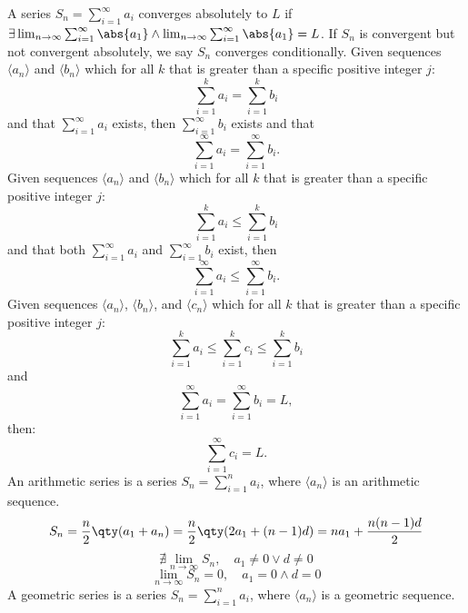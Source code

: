 \documentclass[a4paper,12pt]{report}
\begin{document}
A series $S_n=\sum_{i=1}^{\infty}a_i$ converges absolutely to $L$ if $\exists\lim_{n\to\infty}\sum_{i=1}^{\infty}\abs{a_1}\land\lim_{n\to\infty}\sum_{i=1}^{\infty}\abs{a_1}=L$. If $S_n$ is convergent but not convergent absolutely, we say $S_n$ converges conditionally.
Given sequences $\langle a_n\rangle$ and $\langle b_n\rangle$ which for all $k$ that is greater than a specific positive integer $j$:
\[\sum_{i=1}^ka_i=\sum_{i=1}^kb_i\]
and that $\sum_{i=1}^{\infty}a_i$ exists, then $\sum_{i=1}^{\infty}b_i$ exists and that
\[\sum_{i=1}^{\infty}a_i=\sum_{i=1}^{\infty}b_i.\]
Given sequences $\langle a_n\rangle$ and $\langle b_n\rangle$ which for all $k$ that is greater than a specific positive integer $j$:
\[\sum_{i=1}^ka_i\leq\sum_{i=1}^kb_i\]
and that both $\sum_{i=1}^{\infty}a_i$ and $\sum_{i=1}^{\infty}b_i$ exist, then
\[\sum_{i=1}^{\infty}a_i\leq\sum_{i=1}^{\infty}b_i.\]
Given sequences $\langle a_n\rangle$, $\langle b_n\rangle$, and $\langle c_n\rangle$ which for all $k$ that is greater than a specific positive integer $j$:
\[\sum_{i=1}^ka_i\leq\sum_{i=1}^kc_i\leq\sum_{i=1}^kb_i\]
and
\[\sum_{i=1}^{\infty}a_i=\sum_{i=1}^{\infty}b_i=L,\]
then: 
\[\sum_{i=1}^{\infty}c_i=L.\]
An arithmetic series is a series $S_n=\sum_{i=1}^na_i$, where $\langle a_n\rangle$ is an arithmetic sequence.
\[S_n=\frac{n}{2}\qty(a_1+a_n)=\frac{n}{2}\qty(2a_1+(n-1)d)=na_1+\frac{n(n-1)d}{2}\]
\[\nexists\lim_{n\to\infty}S_n,\quad a_1\neq 0\lor d\neq 0\]
\[\lim_{n\to\infty}S_n=0,\quad a_1=0\land d=0\]
A geometric series is a series $S_n=\sum_{i=1}^na_i$, where $\langle a_n\rangle$ is a geometric sequence.
\end{document}
